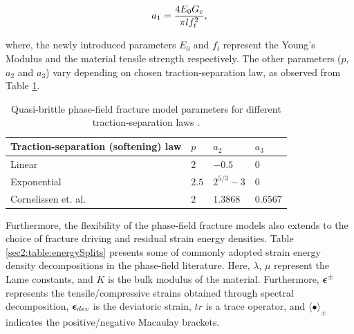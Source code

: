 \documentclass[11pt]{article}
\begin{document}
\begin{equation}
    a_1 = \dfrac{4 E_0 \hbox{$G_c$}}{\pi \hbox{$l$} f_t^2},
\end{equation}

\noindent where, the newly introduced parameters $E_0$ and $f_t$ represent the Young's Modulus and the material tensile strength respectively. The other parameters ($p$, $a_2$ and $a_3$) vary depending on chosen traction-separation law, as observed from Table \ref{sec2:table:quasiBrittleParams}.

\begingroup
\renewcommand{\arraystretch}{1.2}
\begin{table}[ht!]
    \centering
    \begin{tabular}{llll} \hline
     Traction-separation (softening) law & $p$  & $a_2$  & $a_3$ \\ \hline
    Linear    & $2$  & $-0.5$  & $0$ \\ 
    Exponential    & $2.5$  & $2^{5/3}-3$  & $0$ \\ 
    Cornelissen et. al.\cite{cornelissen1986experimental}  & $2$  & $1.3868$  & $0.6567$ \\ \hline
    \end{tabular}
    \caption{Quasi-brittle phase-field fracture model parameters for different traction-separation laws \cite{wu2017}.}
    \label{sec2:table:quasiBrittleParams}
\end{table}
\endgroup

Furthermore, the flexibility of the phase-field fracture models also extends to the choice of fracture driving and residual strain energy densities. Table \ref{sec2:table:energySplits} presents some of commonly adopted strain energy density decompositions in the phase-field literature. Here, $\lambda$, $\mu$ represent the Lame constants, and $K$ is the bulk modulus of the material. Furthermore, $\hbox{$\hbox{\boldmath$\epsilon$}$}^{\pm}$ represents the tensile/compressive strains obtained through spectral decomposition, $\hbox{$\hbox{\boldmath$\epsilon$}$}_{dev}$ is the deviatoric strain, $tr$ is a trace operator, and $\langle\bullet\rangle_{\pm}$ indicates the positive/negative Macaulay brackets.
\end{document}

